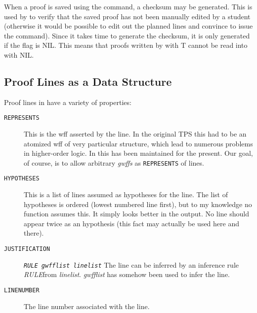 When a proof is saved using the  command, a checksum may be generated.
This is used by \ETPS to verify that the saved proof has not been manually edited by a student
(otherwise it would be possible to edit out the planned lines and convince \ETPS to issue the 
 command). Since it takes time to generate the checksum, it is only 
generated if the flag  is NIL. This means that proofs written by \TPS
with  T cannot be read into \ETPS with  NIL.


\subsection{Proof Lines as a Data Structure}

Proof lines in \ETPS have a variety of properties:

\begin{description}
\item [{\tt REPRESENTS}] This is the wff asserted by the line.  In the original 
TPS this had to be an
atomized wff of very particular structure, which lead to numerous problems
in higher-order logic.  In \ETPS this has been maintained for the present. Our
goal, of course, is to allow arbitrary {\it gwffs} as {\tt REPRESENTS} of lines.

\item [{\tt HYPOTHESES}] This is a list of lines assumed as hypotheses for the line.
The list of hypotheses is ordered (lowest numbered line first), but to
my knowledge no function assumes this.  It simply looks better in the output.
No line should appear twice as an hypothesis (this fact may actually be used
here and there).

\item [{\tt JUSTIFICATION}]  {\tt {{\it RULE} {\it gwfflist} {\it linelist}}} The line can be
inferred by an inference rule {\it RULE}from {\it linelist}.  
{\it gwfflist} has somehow been used to infer the line.

\item [{\tt LINENUMBER}] The line number associated with the line.
\end{description}



